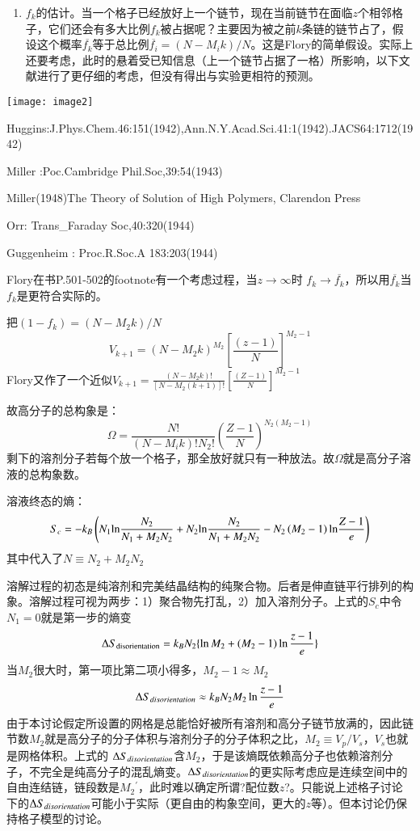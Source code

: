 \documentclass{article} %
\begin{document}
\begin{enumerate}
\item  $f_{k} $的估计。当一个格子已经放好上一个链节，现在当前链节在面临$z$个相邻格子，它们还会有多大比例$f_{k} $被占据呢？主要因为被之前$k$条链的链节占了，假设这个概率$\overline{f_{k} }$等于总比例$\overline{f_{i} }=\left(N-M_{i} k\right)/N$。这是Flory的简单假设。实际上还要考虑，此时的悬着受已知信息（上一个链节占据了一格）所影响，以下文献进行了更仔细的考虑，但没有得出与实验更相符的预测。
\end{enumerate}

\noindent \texttt{[image: image2]}

\noindent Huggins:J.Phys.Chem.46:151(1942),Ann.N.Y.Acad.Sci.41:1(1942).JACS64:1712(1942)

\noindent Miller :Poc.Cambridge Phil.Soc,39:54(1943)

Miller(1948)The Theory of Solution of High Polymers, Clarendon Press

\noindent Orr: Trans\_Faraday Soc,40:320(1944)

\noindent Guggenheim : Proc.R.Soc.A 183:203(1944)

\noindent Flory在书P.501-502的footnote有一个考虑过程，当$z\to \infty $时 $f_{k} \to \overline{f_{k} }$，所以用$\overline{f_{k} }$当$f_{k} $是更符合实际的。

\noindent 把$\left(1-f_{k} \right)=\left(N-M_{2} k\right)/N$
\[V_{k+1} =(N-M_{2} k)^{M_{2} } [\frac{\left(z-1\right)}{N} ]^{M_{2} -1} \] 
Flory又作了一个近似$V_{k+1} =\frac{\left(N-M_{2} k\right)!}{\left[N-M_{2} \left(k+1\right)\right]!} \left[\frac{\left(Z-1\right)}{N} \right]^{M_{2} -1} $

\noindent 故高分子的总构象是：
\[\Omega =\frac{N!}{\left(N-M_{i} k\right)!N_{2} !} \left(\frac{Z-1}{N} \right)^{N_{2} \left(M_{2} -1\right)} \] 
剩下的溶剂分子若每个放一个格子，那全放好就只有一种放法。故$\Omega $就是高分子溶液的总构象数。

\noindent 溶液终态的熵：
\[S_{c} =-k_{B} \left(N_{1} {\rm ln}\frac{N_{2} }{N_{1} +M_{2} N_{2} } +N_{2} {\rm ln}\frac{N_{2} }{N_{1} +M_{2} N_{2} } -N_{2} \left(M_{2} -1\right){\rm ln}\frac{Z-1}{e} \right)\] 
其中代入了$N\equiv N_{2} +M_{2} N_{2} $ 

\noindent 溶解过程的初态是纯溶剂和完美结晶结构的纯聚合物。后者是伸直链平行排列的构象。溶解过程可视为两步：1）聚合物先打乱，2）加入溶剂分子。上式的$S_{c} $中令$N_{1} =0$就是第一步的熵变
\[{\rm \Delta }S_{{\rm disorientation}} =k_{B} N_{2} \{ \ln M_{2} +(M_{2} -1)\ln \frac{z-1}{e} \} \] 
当$M_{2} $很大时，第一项比第二项小得多，$M_{2} -1\approx M_{2} $ 
\[{\rm \Delta }S_{disorientation} \approx k_{B} N_{2} M_{2} \ln \frac{z-1}{e} \] 
由于本讨论假定所设置的网格是总能恰好被所有溶剂和高分子链节放满的，因此链节数$M_{2} $就是高分子的分子体积与溶剂分子的分子体积之比，$M_2\equiv V_p/V_s$，$V_{s} $也就是网格体积。上式的 ${\rm \Delta }S_{disorientation} $含$M_{2} $，于是该熵既依赖高分子也依赖溶剂分子，不完全是纯高分子的混乱熵变。${\rm \Delta }S_{disorientation} $的更实际考虑应是连续空间中的自由连结链，链段数是$M_{2} {}^{{'} } $，此时难以确定所谓?配位数$z$?。只能说上述格子讨论下的${\rm \Delta }S_{disorientation} $可能小于实际（更自由的构象空间，更大的$z$等）。但本讨论仍保持格子模型的讨论。
\end{document}
